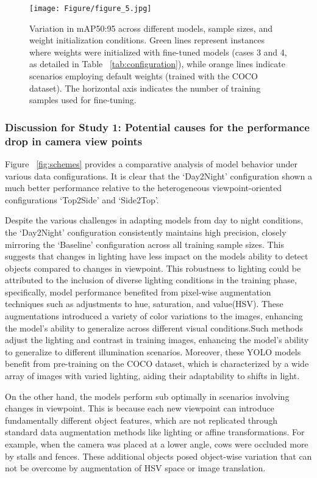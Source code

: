 \begin{figure}[h]
    \centering
    \texttt{[image: Figure/figure\_5.jpg]}
    \caption{Variation in mAP50:95 across different models, sample sizes, and weight initialization conditions. Green lines represent instances where weights were initialized with fine-tuned models (cases 3 and 4, as detailed in Table ~\ref{tab:configuration}), while orange lines indicate scenarios employing default weights (trained with the COCO dataset). The horizontal axis indicates the number of training samples used for fine-tuning.}
    \label{fig:finetune}
\end{figure}



\subsubsection*{Discussion for Study 1: Potential causes for the performance drop in camera view points}

Figure ~\ref{fig:schemes} provides a comparative analysis of model behavior under various data configurations. It is clear that the `Day2Night' configuration shown a much better performance relative to the heterogeneous viewpoint-oriented configurations `Top2Side' and `Side2Top'.

Despite the various challenges in adapting models from day to night conditions, the `Day2Night' configuration consistently maintains high precision, closely mirroring the `Baseline' configuration across all training sample sizes. This suggests that changes in lighting have less impact on the models ability to detect objects compared to changes in viewpoint. This robustness to lighting could be attributed to the inclusion of diverse lighting conditions in the training phase, specifically, model performance benefited from pixel-wise augmentation techniques such as adjustments to hue, saturation, and value(HSV). These augmentations introduced a variety of color variations to the images, enhancing the model's ability to generalize across different visual conditions.Such methods adjust the lighting and contrast in training images, enhancing the model's ability to generalize to different illumination scenarios. Moreover, these YOLO models benefit from pre-training on the COCO dataset, which is characterized by a wide array of images with varied lighting, aiding their adaptability to shifts in light.

On the other hand, the models perform sub optimally in scenarios involving changes in viewpoint. This is because each new viewpoint can introduce fundamentally different object features, which are not replicated through standard data augmentation methods like lighting or affine transformations. For example, when the camera was placed at a lower angle, cows were occluded more by stalls and fences. These additional objects posed object-wise variation that can not be overcome by augmentation of HSV space or image translation.

